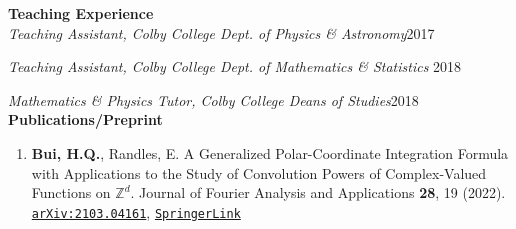 \documentclass[10pt]{article}
\begin{document}
\noindent \large{{\textbf{Teaching Experience}}} \normalsize \\ 

\vspace{-5pt}
\noindent \textit{Teaching Assistant, Colby College Dept. of Physics \& Astronomy}\hfill 2017 


\noindent \textit{Teaching Assistant, Colby College Dept. of Mathematics \& Statistics} \hfill 2018 

\noindent \textit{Mathematics \& Physics Tutor, Colby College Deans of Studies}\hfill 2018\\

\noindent \large{\textbf{{Publications/Preprint}}}	\normalsize 

\begin{enumerate}
	\setlength\itemsep{-4pt}
	\item \textbf{Bui, H.Q.}, Randles, E. {A Generalized Polar-Coordinate Integration Formula with Applications to the Study of Convolution Powers of Complex-Valued Functions on $\mathbb{Z}^d$}. Journal of  Fourier Analysis and Applications \textbf{28}, 19 (2022). \href{https://arxiv.org/abs/2103.04161}{\texttt{arXiv:2103.04161}}, \href{https://doi.org/10.1007/s00041-022-09905-x}{\texttt{SpringerLink}}
	
\end{enumerate}
\end{document}
